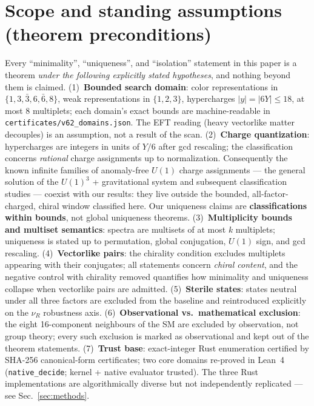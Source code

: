 \documentclass[aps,prd,preprint,nofootinbib]{revtex4-2}
\begin{document}
\maketitle

\section{Scope and standing assumptions (theorem preconditions)}
\label{sec:scope}

Every ``minimality'', ``uniqueness'', and ``isolation'' statement in this paper
is a theorem \emph{under the following explicitly stated hypotheses}, and
nothing beyond them is claimed. (1)~\textbf{Bounded search domain}: color
representations in $\{1,3,\bar 3,6,\bar 6,8\}$, weak representations in
$\{1,2,3\}$, hypercharges $|y|=|6Y|\le 18$, at most 8 multiplets; each domain's
exact bounds are machine-readable in \texttt{certificates/v62\_domains.json}.
The EFT reading (heavy vectorlike matter decouples) is an assumption, not a
result of the scan. (2)~\textbf{Charge quantization}: hypercharges are integers
in units of $Y/6$ after gcd rescaling; the classification concerns
\emph{rational} charge assignments up to normalization. Consequently the known
infinite families of anomaly-free $U(1)$ charge assignments --- the general
solution of the $U(1)^3$ + gravitational system \cite{Costa} and subsequent
classification studies --- coexist with our results: they live outside the
bounded, all-factor-charged, chiral window classified here. Our uniqueness
claims are \textbf{classifications within bounds}, not global uniqueness
theorems. (3)~\textbf{Multiplicity bounds and multiset semantics}: spectra are
multisets of at most $k$ multiplets; uniqueness is stated up to permutation,
global conjugation, $U(1)$ sign, and gcd rescaling.
(4)~\textbf{Vectorlike pairs}: the chirality condition excludes multiplets
appearing with their conjugates; all statements concern \emph{chiral content},
and the negative control with chirality removed quantifies how minimality and
uniqueness collapse when vectorlike pairs are admitted.
(5)~\textbf{Sterile states}: states neutral under all three factors are
excluded from the baseline and reintroduced explicitly on the $\nu_R$
robustness axis. (6)~\textbf{Observational vs.\ mathematical exclusion}: the
eight 16-component neighbours of the SM are excluded by observation, not group
theory; every such exclusion is marked as observational and kept out of the
theorem statements. (7)~\textbf{Trust base}: exact-integer Rust enumeration
certified by SHA-256 canonical-form certificates; two core domains re-proved in
Lean~4 (\texttt{native\_decide}; kernel + native evaluator trusted). The three
Rust implementations are algorithmically diverse but not independently
replicated --- see Sec.~\ref{sec:methods}.
\end{document}
